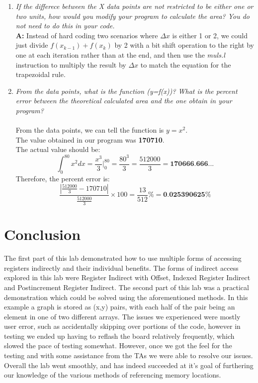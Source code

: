 \documentclass[letterpaper]{article}
\begin{document}
\begin{enumerate}
    \item \textit{If the differece between the X data points are not restricted to be either one
                  or two units, how would you modify your program to calculate the area? You do
                  not need to do this in your code.}\\
          \textbf{A: }
          Instead of hard coding two scenarios where $\Delta x$ is either 1 or 2,
          we could just divide $f(x_{k-1})+f(x_k)$ by 2 with a bit shift operation
          to the right by one at each iteration rather than at the end, and then use the \textit{muls.l}
          instruction to multiply the result by $\Delta x$ to match the equation for the trapezoidal rule.
    \item \textit{From the data points, what is the function (y=f(x))? What is the percent error between the
                  theoretical calculated area and the one obtain in your program?}\\
          \\From the data points, we can tell the function is $y=x^2$.\\
          The value obtained in our program was \textbf{170710}.\\
          The actual value should be:\\
          $$\int_0^{80} x^2 dx = \frac{x^3}{3}\Big|_0^{80} = \frac{80^3}{3} = \frac{512000}{3}= \textbf{170666.666...} $$
          Therefore, the percent error is:
          $$\frac{|\frac{512000}{3}-170710|}{\frac{512000}{3}}\times 100 = \frac{13}{512}\% = \textbf{0.025390625\%}$$

  \end{enumerate}

\section{Conclusion}
The first part of this lab demonstrated how to use multiple forms of accessing
registers indirectly and their individual benefits. The forms of indirect access
explored in this lab were Register Indirect with Offset, Indexed Register
Indirect and Postincrement Register Indirect. The second part of this lab was a
practical demonstration which could be solved using the aforementioned methods.
In this example a graph is stored as (x,y) pairs, with each half of the pair
being an element in one of two different arrays. The issues we experienced were
mostly user error, such as accidentally skipping over portions of the code,
however in testing we ended up having to reflash the board relatively frequently,
which slowed the pace of testing somewhat. However, once we got the feel for the
testing and with some assistance from the TAs we were able to resolve our issues.
Overall the lab went smoothly, and has indeed succeeded at it's goal of furthering
our knowledge of the various methods of referencing memory locations.
\end{document}
